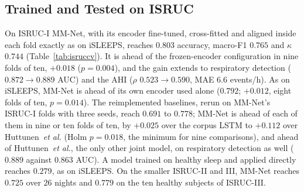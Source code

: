 \documentclass{ieeeaccess}
\newcommand{\isrAcc}{0.803}
\begin{document}
\subsection{Trained and Tested on ISRUC}
On ISRUC-I MM-Net, with its encoder fine-tuned, cross-fitted and aligned inside each fold
exactly as on iSLEEPS, reaches $\isrAcc$ accuracy, macro-F1 $0.765$ and $\kappa$ $0.744$
(Table~\ref{tab:isruccv}). It is ahead of the frozen-encoder configuration in nine folds of
ten, $+0.018$ ($p=0.004$), and the gain extends to respiratory detection ($0.872\rightarrow0.889$
AUC) and the AHI ($\rho$ $0.523\rightarrow0.590$, MAE $6.6$ events/h). As on iSLEEPS, MM-Net is
ahead of its own encoder used alone ($0.792$; $+0.012$, eight folds of ten, $p=0.014$). The
reimplemented baselines, rerun on MM-Net's ISRUC-I folds with three seeds, reach $0.691$ to
$0.778$; MM-Net is ahead of each of them in nine or ten folds of ten, by $+0.025$ over the corpus
LSTM to $+0.112$ over Huttunen~\textit{et al.} (Holm $p=0.018$, the minimum for nine
comparisons), and ahead of Huttunen~\textit{et al.}, the only other joint model, on respiratory
detection as well ($0.889$ against $0.863$ AUC). A model trained on healthy sleep and applied
directly reaches $0.279$, as on iSLEEPS. On the smaller ISRUC-II and III, MM-Net reaches $0.725$ over $26$ nights and $0.779$ on
the ten healthy subjects of ISRUC-III.
\end{document}

